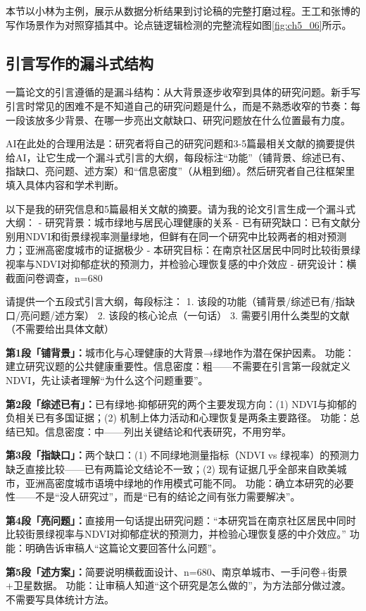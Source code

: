 本节以小林为主例，展示从数据分析结果到讨论稿的完整打磨过程。王工和张博的写作场景作为对照穿插其中。论点链逻辑检测的完整流程如图\ref{fig:ch5_06}所示。

\subsection{引言写作的漏斗式结构}

一篇论文的引言遵循的是漏斗结构：从大背景逐步收窄到具体的研究问题。新手写引言时常见的困难不是不知道自己的研究问题是什么，而是不熟悉收窄的节奏：每一段该放多少背景、在哪一步亮出文献缺口、研究问题放在什么位置最有力度。

AI在此处的合理用法是：研究者将自己的研究问题和3-5篇最相关文献的摘要提供给AI，让它生成一个漏斗式引言的大纲，每段标注``功能''（铺背景、综述已有、指缺口、亮问题、述方案）和``信息密度''（从粗到细）。然后研究者自己往框架里填入具体内容和学术判断。

\begin{userbox}
以下是我的研究信息和5篇最相关文献的摘要。请为我的论文引言生成一个漏斗式大纲：
- 研究背景：城市绿地与居民心理健康的关系
- 已有研究缺口：已有文献分别用NDVI和街景绿视率测量绿地，但鲜有在同一个研究中比较两者的相对预测力；亚洲高密度城市的证据极少
- 本研究目标：在南京社区居民中同时比较街景绿视率与NDVI对抑郁症状的预测力，并检验心理恢复感的中介效应
- 研究设计：横截面问卷调查，n=680

请提供一个五段式引言大纲，每段标注：
1. 该段的功能（铺背景/综述已有/指缺口/亮问题/述方案）
2. 该段的核心论点（一句话）
3. 需要引用什么类型的文献（不需要给出具体文献）
\end{userbox}

\begin{aibox}
\textbf{第1段「铺背景」：}城市化与心理健康的大背景→绿地作为潜在保护因素。
功能：建立研究议题的公共健康重要性。信息密度：粗——不需要在引言第一段就定义NDVI，先让读者理解``为什么这个问题重要''。

\textbf{第2段「综述已有」：}已有绿地-抑郁研究的两个主要发现方向：(1) NDVI与抑郁的负相关已有多国证据；(2) 机制上体力活动和心理恢复是两条主要路径。
功能：总结已知。信息密度：中——列出关键结论和代表研究，不用穷举。

\textbf{第3段「指缺口」：}两个缺口：(1) 不同绿地测量指标（NDVI vs 绿视率）的预测力缺乏直接比较——已有两篇论文结论不一致；(2) 现有证据几乎全部来自欧美城市，亚洲高密度城市语境中绿地的作用模式可能不同。
功能：确立本研究的必要性——不是``没人研究过''，而是``已有的结论之间有张力需要解决''。

\textbf{第4段「亮问题」：}直接用一句话提出研究问题：``本研究旨在南京社区居民中同时比较街景绿视率与NDVI对抑郁症状的预测力，并检验心理恢复感的中介效应。''
功能：明确告诉审稿人``这篇论文要回答什么问题''。

\textbf{第5段「述方案」：}简要说明横截面设计、n=680、南京单城市、一手问卷+街景+卫星数据。
功能：让审稿人知道``这个研究是怎么做的''，为方法部分做过渡。不需要写具体统计方法。
\end{aibox}

